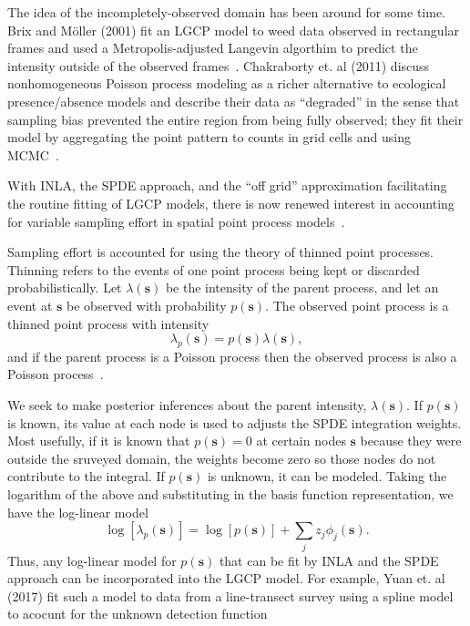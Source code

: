 \documentclass[]{interact}
\begin{document}
The idea of the incompletely-observed domain has been around for some time.
Brix and M\"{o}ller (2001) fit an LGCP model to weed data observed in
rectangular frames and used a Metropolis-adjusted Langevin algorthim
to predict the intensity outside of the observed frames~\cite{brixmoeller}.
Chakraborty et. al (2011) discuss nonhomogeneous Poisson process modeling as
a richer alternative to ecological presence/absence models and describe their
data as ``degraded'' in the sense that sampling bias prevented the entire
region from being fully observed; they fit their model by aggregating the
point pattern to counts in grid cells and using MCMC~\cite{chakrabortyetal}.

With INLA, the SPDE approach, and the ``off grid'' approximation
facilitating the routine fitting of LGCP models, there is now renewed interest
in accounting for variable sampling effort in spatial point process
models~\cite{simpsonetal,yuanetal}.

Sampling effort is accounted for using the theory of thinned point processes.
Thinning refers to the events of one point process being kept or discarded
probabilistically. Let \(\lambda(\mathbf{s})\) be the intensity of the parent
process, and let an event at \(\mathbf{s}\) be observed with probability
\(p(\mathbf{s})\). The observed point process is a thinned point process with
intensity
\begin{displaymath}
\lambda_{p}(\mathbf{s}) = p(\mathbf{s}) \lambda(\mathbf{s}),
\end{displaymath}
and if the parent process is a Poisson process then the observed process is
also a Poisson process~\cite{moellerwaagepetersen}.

We seek to make posterior inferences about the parent intensity,
 \(\lambda(\mathbf{s})\). If \(p(\mathbf{s})\) is known, its value at each node
is used to adjusts the SPDE integration weights. Most usefully, if it is known
that \(p(\mathbf{s}) = 0\) at certain nodes \(\mathbf{s}\) because they were
outside the sruveyed domain, the weights become zero so those nodes do not
contribute to the integral. If \(p(\mathbf{s})\) is unknown, it can be modeled.
Taking the logarithm of the above and substituting in the basis function
representation, we have the log-linear model
\begin{displaymath}
\log\left[\lambda_{p}(\mathbf{s})\right]
= \log\left[p(\mathbf{s})\right] + \sum_{j} z_{j} \phi_{j}(\mathbf{s}).
\end{displaymath}
Thus, any log-linear model for \(p(\mathbf{s})\) that can be fit by INLA and
the SPDE approach can be incorporated into the LGCP model. For example, Yuan
et. al (2017) fit such a model to data from a line-transect survey using a
spline model to acocunt for the unknown detection function~\cite{yuanetal}
\end{document}
